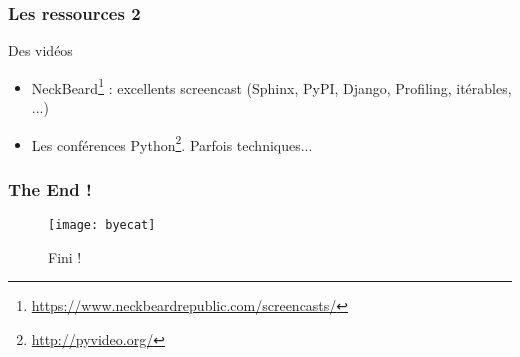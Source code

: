 \documentclass{beamer}
\begin{document}
\begin{frame}
  \frametitle{Les ressources 2}

  \begin{block}{Des vidéos}
    \begin{itemize}
    \item
      NeckBeard\footnote{\url{https://www.neckbeardrepublic.com/screencasts/}}
      : excellents screencast (Sphinx, PyPI, Django, Profiling,
      itérables, ...)
    \item Les conférences
      Python\footnote{\url{http://pyvideo.org/}}. Parfois techniques...
    \end{itemize}
  \end{block}
\end{frame}

\begin{frame}
  \frametitle{The End !}

  \begin{figure}[!h*]
    \centering
    \texttt{[image: byecat]}
    \caption{Fini !}
    \label{fig:end}
  \end{figure}
\end{frame}

\end{document}
